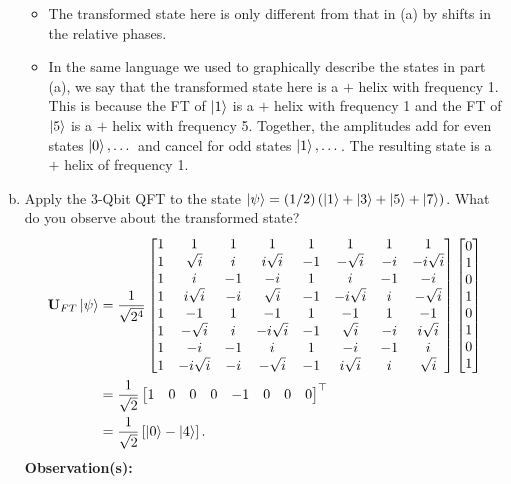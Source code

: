 \documentclass{book}
\theoremstyle{definition}
\newcommand{\nn}{\nonumber}
\newcommand{\f}[2]{\frac{#1}{#2}}
\newcommand{\lp}{\left(}
\newcommand{\rp}{\right)}
\newcommand{\lb}{\left[}
\newcommand{\rb}{\right]}
\newcommand{\lc}{\left\{}
\newcommand{\rc}{\right\}}
\newcommand{\U}{\mathbf{U}}
\begin{document}
\begin{enumerate}[(a)]
	\begin{itemize}
		
	\item The transformed state here is only different from that in (a) by shifts in the relative phases. 
	
	\item In the same language we used to graphically describe the states in part (a), we say that the transformed state here is a $+$ helix with frequency 1. This is because the FT of $\ket{1}$ is a $+$ helix with frequency 1 and the FT of $\ket{5}$ is a $+$ helix with frequency 5. Together, the amplitudes add for even states $\ket{0},\dots$ and cancel for odd states $\ket{1},\dots$. The resulting state is a $+$ helix of frequency 1. 
	
	
	
	\end{itemize}
	
	\newpage
	
	
	
	
	\item Apply the 3-Qbit QFT to the state $\ket{\psi} = (1/{2})\lp \ket{1} + \ket{3} + \ket{5} + \ket{7} \rp$. What do you observe about the transformed state?
	\begin{align}
	\U_{FT}\ket{\psi} &= \f{1}{\sqrt{2^4}}\begin{bmatrix}
	1 & 1 & 1 & 1 & 1 & 1 & 1 & 1\\
	1 &\sqrt{i}&i&i\sqrt{i}&-1&-\sqrt{i}&-i&-i\sqrt{i}\\
	1&i&-1&-i&1&i&-1&-i\\
	1&i\sqrt{i}&-i&\sqrt{i}&-1&-i\sqrt{i}&i&-\sqrt{i}\\
	1 & -1 & 1 & -1 & 1 & -1 & 1 & -1\\
	1&-\sqrt{i}&i&-i\sqrt{i}&-1&\sqrt{i}&-i&i\sqrt{i}\\
	1&-i&-1&i&1&-i&-1&i\\
	1&-i\sqrt{i}&-i&-\sqrt{i}&-1&i\sqrt{i}&i&\sqrt{i}
	\end{bmatrix}
	\begin{bmatrix}
	0\\1\\0\\1\\0\\1\\0\\1
	\end{bmatrix}\nn\\
	&= \f{1}{\sqrt{2}}\begin{bmatrix}
	1&0&0&0&-1&0&0&0
	\end{bmatrix}^\top\nn\\
	&= \f{1}{\sqrt{2}}\lb \ket{0} - \ket{4} \rb.
	\end{align}
	\textbf{Observation(s):}
	

\end{enumerate}
\end{document}
